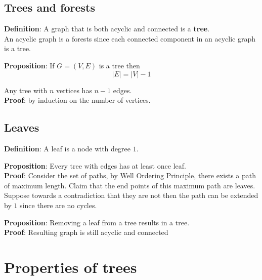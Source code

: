 \subsection{Trees and forests}
\begin{framed}
   \textbf{Definition}: A graph that is both acyclic and connected is a \textbf{tree}.  \\

   An acyclic graph is a forests since each connected component in an acyclic graph is a tree. \\
\end{framed}


\begin{framed}
   \textbf{Proposition}: If $G= (V, E)$ is a tree then
   \[
     |E| = |V| - 1
   \] 

   Any tree with $n$ vertices has $n - 1$ edges. \\

   \textbf{Proof}: by induction on the number of vertices. 
\end{framed}

\subsection{Leaves}

\begin{framed}
   \textbf{Definition}: A leaf is a node with degree $1$. 
\end{framed}

\begin{framed}
   \textbf{Proposition}: Every tree with edges has at least once leaf. \\

   \textbf{Proof}: Consider the set of paths, by Well Ordering Principle, there exists a path of maximum length. Claim that the end points of this maximum path are leaves. Suppose towards a contradiction that they are not then the path can be extended by $1$ since there are no cycles. 
\end{framed}

\begin{framed}
   \textbf{Proposition}: Removing a leaf from a tree results in a tree. \\

   \textbf{Proof}: Resulting graph is still acyclic and connected
\end{framed}

\section{Properties of trees}


